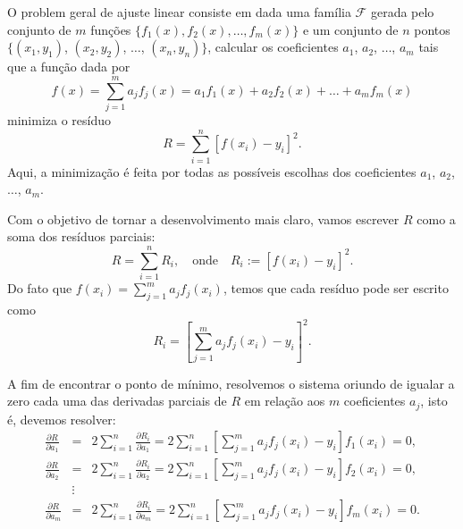 O problem geral de ajuste linear consiste em dada uma família $\mathcal{F}$ gerada pelo conjunto de $m$ funções $\{f_1(x), f_2(x), \dotsc, f_m(x)\}$ e um conjunto de $n$ pontos $\{(x_1, y_1)$, $(x_2, y_2)$, $\ldots$, $(x_n, y_n)\}$, calcular os coeficientes $a_1$, $a_2$, $\ldots$, $a_m$ tais que a função dada por
\begin{equation*}
  f(x) = \sum_{j=1}^m a_jf_j(x) = a_1f_1(x)+a_2f_2(x)+\ldots+a_mf_m(x)
\end{equation*}
minimiza o resíduo
\begin{equation*}
  R= \sum_{i=1}^n \left[f(x_i)-y_i\right]^2.
\end{equation*}
Aqui, a minimização é feita por todas as possíveis escolhas dos coeficientes $a_1$, $a_2$, $\ldots$, $a_m$.

Com o objetivo de tornar a desenvolvimento mais claro, vamos escrever $R$ como a soma dos resíduos parciais:
\begin{equation*}
  R= \sum_{i=1}^n R_i,\quad \text{onde} \quad R_i := \left[f(x_i)-y_i\right]^2.
\end{equation*}
Do fato que $f(x_i)=\sum_{j=1}^m a_jf_j(x_i)$, temos que cada resíduo pode ser escrito como
\begin{equation*}
  R_i=  \left[\sum_{j=1}^m a_jf_j(x_i)-y_i\right]^2.
\end{equation*}

A fim de encontrar o ponto de mínimo, resolvemos o sistema oriundo de igualar a zero cada uma das derivadas parciais de $R$ em relação aos $m$ coeficientes $a_j$, isto é, devemos resolver:
\begin{eqnarray*}
\frac{\partial R}{\partial a_1} &=& 2 \sum_{i=1}^n \frac{\partial R_i}{\partial a_1} = 2\sum_{i=1}^n \left[\sum_{j=1}^m a_jf_j(x_i)-y_i\right] f_1(x_i)=0,\\
\frac{\partial R}{\partial a_2} &=& 2 \sum_{i=1}^n \frac{\partial R_i}{\partial a_2}=2\sum_{i=1}^n \left[\sum_{j=1}^m a_jf_j(x_i)-y_i\right] f_2(x_i)=0,\\
&\vdots&\\
\frac{\partial R}{\partial a_m} &=& 2 \sum_{i=1}^n \frac{\partial R_i}{\partial a_m}= 2\sum_{i=1}^n \left[\sum_{j=1}^m a_jf_j(x_i)-y_i\right] f_m(x_i)=0.
\end{eqnarray*}

